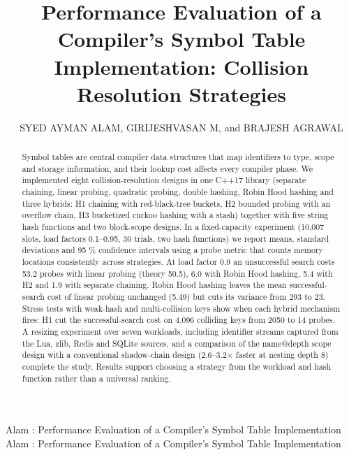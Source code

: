 \documentclass{ieeeaccess}
\begin{document}

\title{Performance Evaluation of a Compiler's Symbol Table Implementation: Collision Resolution Strategies}

\author{\uppercase{Syed Ayman Alam},
\uppercase{Girijeshvasan M}, and
\uppercase{Brajesh Agrawal}}
\address[1]{School of Computer Science and Engineering (SCOPE), Vellore Institute of Technology, Vellore, Tamil Nadu, India (e-mail: syed.aymanalam2024@vitstudents.ac.in; girijeshvasan.m2024@vitstudent.ac.in; brajesh.kumar2024@vitstudent.ac.in)}

\markboth
{Alam \headeretal: Performance Evaluation of a Compiler's Symbol Table Implementation}
{Alam \headeretal: Performance Evaluation of a Compiler's Symbol Table Implementation}


\begin{abstract}
Symbol tables are central compiler data structures that map identifiers to type, scope and storage information, and their lookup cost affects every compiler phase. We implemented eight collision-resolution designs in one C++17 library (separate chaining, linear probing, quadratic probing, double hashing, Robin Hood hashing and three hybrids: H1 chaining with red-black-tree buckets, H2 bounded probing with an overflow chain, H3 bucketized cuckoo hashing with a stash) together with five string hash functions and two block-scope designs. In a fixed-capacity experiment (10,007 slots, load factors 0.1--0.95, 30 trials, two hash functions) we report means, standard deviations and 95 \% confidence intervals using a probe metric that counts memory locations consistently across strategies. At load factor 0.9 an unsuccessful search costs 53.2 probes with linear probing (theory 50.5), 6.0 with Robin Hood hashing, 5.4 with H2 and 1.9 with separate chaining. Robin Hood hashing leaves the mean successful-search cost of linear probing unchanged (5.49) but cuts its variance from 293 to 23. Stress tests with weak-hash and multi-collision keys show when each hybrid mechanism fires: H1 cut the successful-search cost on 4,096 colliding keys from 2050 to 14 probes. A resizing experiment over seven workloads, including identifier streams captured from the Lua, zlib, Redis and SQLite sources, and a comparison of the name@depth scope design with a conventional shadow-chain design (2.6--3.2$\times$ faster at nesting depth 8) complete the study. Results support choosing a strategy from the workload and hash function rather than a universal ranking.
\end{abstract}
\end{document}
